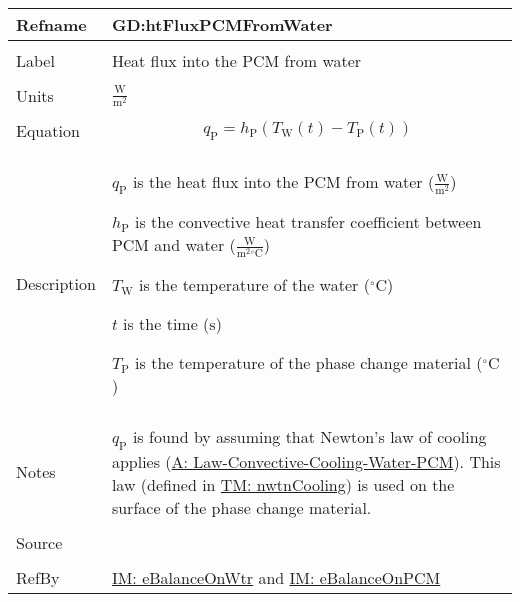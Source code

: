 \documentclass[12pt]{article}
\begin{document}
\vspace{\baselineskip}
\noindent
\begin{minipage}{\textwidth}
\begin{tabular}{>{\raggedright}p{}>{\raggedright\arraybackslash}p{}}
\toprule \textbf{Refname} & \textbf{GD:htFluxPCMFromWater}
\label{GD:htFluxPCMFromWater}
\\ \midrule \\
Label & Heat flux into the PCM from water
        
\\ \midrule \\
Units & $\frac{\text{W}}{\text{m}^{2}}$
        
\\ \midrule \\
Equation & \begin{displaymath}
           {q_{\text{P}}}={h_{\text{P}}} \left({T_{\text{W}}}\left(t\right)-{T_{\text{P}}}\left(t\right)\right)
           \end{displaymath}
\\ \midrule \\
Description & \begin{symbDescription}
              \item{${q_{\text{P}}}$ is the heat flux into the PCM from water ($\frac{\text{W}}{\text{m}^{2}}$)}
              \item{${h_{\text{P}}}$ is the convective heat transfer coefficient between PCM and water ($\frac{\text{W}}{\text{m}^{2}{}^{\circ}\text{C}}$)}
              \item{${T_{\text{W}}}$ is the temperature of the water (${{}^{\circ}\text{C}}$)}
              \item{$t$ is the time (${\text{s}}$)}
              \item{${T_{\text{P}}}$ is the temperature of the phase change material (${{}^{\circ}\text{C}}$)}
              \end{symbDescription}
\\ \midrule \\
Notes & ${q_{\text{P}}}$ is found by assuming that Newton's law of cooling applies (\hyperref[assumpLCCWP]{A: Law-Convective-Cooling-Water-PCM}). This law (defined in \hyperref[TM:nwtnCooling]{TM: nwtnCooling}) is used on the surface of the phase change material.
        
\\ \midrule \\
Source & \cite{koothoor2013}
         
\\ \midrule \\
RefBy & \hyperref[IM:eBalanceOnWtr]{IM: eBalanceOnWtr} and \hyperref[IM:eBalanceOnPCM]{IM: eBalanceOnPCM}
        
\\ \bottomrule
\end{tabular}
\end{minipage}
\end{document}
